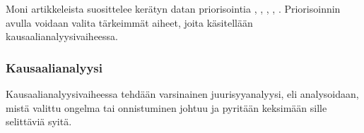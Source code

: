 Moni artikkeleista suosittelee kerätyn datan priorisointia \citep{card1998learning}, \citep{birk2002postmortem}, \citep{staalhane2003post}, \citep{staalhane2004root}, \citep{karlsson2006case}. Priorisoinnin avulla voidaan valita tärkeimmät aiheet, joita käsitellään kausaalianalyysivaiheessa.

\subsubsection{Kausaalianalyysi}
Kausaalianalyysivaiheessa tehdään varsinainen juurisyyanalyysi, eli analysoidaan, mistä valittu ongelma tai onnistuminen johtuu ja pyritään keksimään sille selittäviä syitä. 

